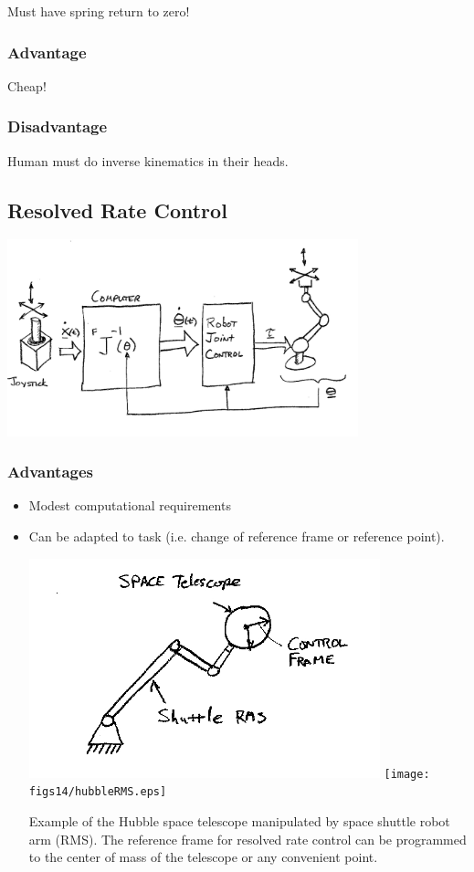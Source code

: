Must have spring return to zero!

\subsubsection*{Advantage}
Cheap!
\subsubsection*{Disadvantage}
Human must do inverse kinematics in their heads.



\subsection{Resolved Rate Control}

\includegraphics[width=4.0in]{figs14/00399.jpg}


\subsubsection*{Advantages}
\begin{itemize}
	\item Modest computational requirements
	\item Can be adapted to task (i.e. change of reference frame or reference point).

	\includegraphics[width=4.0in]{figs14/00400.jpg} \texttt{[image: figs14/hubbleRMS.eps]}	%

        Example of the Hubble space telescope manipulated by space shuttle robot arm (RMS).   The reference frame for resolved rate control can be programmed to the center of mass of the telescope or any convenient point. 	%
\end{itemize}

